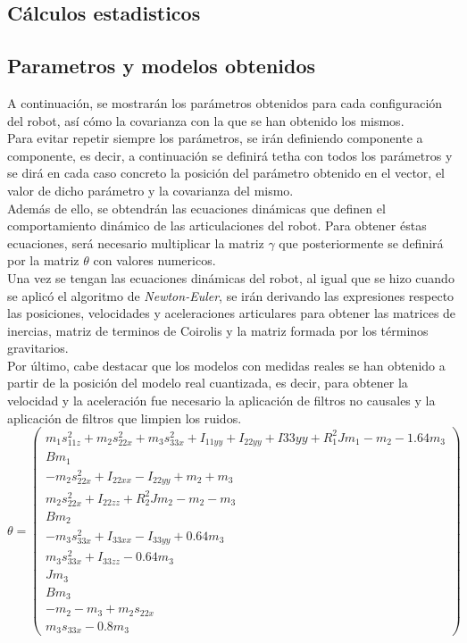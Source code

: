 	\subsection{Cálculos estadisticos}
	\subsection{Parametros y modelos obtenidos}
	A continuación, se mostrarán los parámetros obtenidos para cada configuración del robot, así cómo la covarianza con la que se han obtenido los mismos.\\
	Para evitar repetir siempre los parámetros, se irán definiendo componente a componente, es decir, a continuación se definirá tetha con todos los parámetros y se dirá en cada caso concreto la posición del parámetro obtenido en el vector, el valor de dicho parámetro y la covarianza del mismo. \\

	Además de ello, se obtendrán las ecuaciones dinámicas que definen el comportamiento dinámico de las articulaciones del robot. Para obtener éstas ecuaciones, será necesario multiplicar la matriz $\gamma$ que posteriormente se definirá por la matriz $\theta$ con valores numericos. \\
	Una vez se tengan las ecuaciones dinámicas del robot, al igual que se hizo cuando se aplicó el algoritmo de \textit{Newton-Euler}, se irán derivando las expresiones respecto las posiciones, velocidades y aceleraciones articulares para obtener las matrices de inercias, matriz de terminos de Coirolis y la matriz formada por los términos gravitarios.\\

	Por último, cabe destacar que los modelos con medidas reales se han obtenido a partir de la posición del modelo real cuantizada, es decir, para obtener la velocidad y la aceleración fue necesario la aplicación de filtros no causales y la aplicación de filtros que limpien los ruidos.
\begin{equation}
\theta=
	\begin{pmatrix}
		  m_{1}s_{11z}^{2} + m_{2}s_{22x}^{2} + m_{3}s_{33x}^{2} + I_{11yy} + I_{22yy} + I{33yy} + R_{1}^{2}Jm_1 - m_2 - 1.64m_3 \\
		  Bm_{1}  \\
		  -m_{2}s_{22x}^{2} + I_{22xx} - I_{22yy} + m_{2} + m_{3} \\
		  m_{2}s_{22x}^{2} + I_{22zz} + R_{2}^{2}Jm_{2} - m_{2} - m_{3}  \\
		  Bm_{2} \\
		  - m_{3}s_{33x}^{2} + I_{33xx} - I_{33yy} + 0.64m_{3} \\
		  m_{3}s_{33x}^{2} + I_{33zz} - 0.64m_{3}  \\
		  Jm_{3}  \\
		  Bm_{3}  \\
		  -m_{2} -m_{3} + m_{2}s_{22x}  \\
		  m_{3}s_{33x} - 0.8m_{3}
	\end{pmatrix}
\end{equation}

